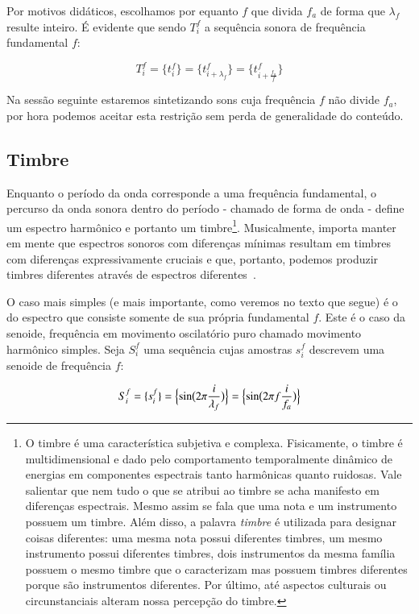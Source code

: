 Por motivos didáticos, escolhamos por equanto $f$ que divida $f_a$ de forma que $\lambda_f$ resulte inteiro.
É evidente que sendo $T_i^f$ a sequência sonora de frequência fundamental $f$:
    
\begin{equation}\label{periodicidade}
     T^f_i=\{ t_i^f \}=\{ t^f_{i+\lambda_{f}}  \}= \{ t^f_{i+\frac{f_a}{f}} \}
\end{equation}

Na sessão seguinte estaremos sintetizando sons cuja frequência $f$ não divide $f_a$, por hora podemos aceitar esta restrição sem perda de generalidade do conteúdo.

\subsection{Timbre}
Enquanto o período da onda corresponde a uma frequência fundamental, o percurso
da onda sonora dentro do período - chamado de forma de onda - define um espectro harmônico e portanto
um timbre\footnote{O timbre é uma característica subjetiva e complexa. Fisicamente,
o timbre é multidimensional e dado pelo comportamento temporalmente dinâmico
de energias em componentes espectrais tanto harmônicas quanto ruidosas.  Vale salientar que nem tudo
o que se atribui ao timbre se acha manifesto em diferenças espectrais. Mesmo
assim se fala que uma nota e um instrumento possuem um timbre.
Além disso, a palavra \emph{timbre} é utilizada para designar coisas diferentes: uma mesma nota
possui diferentes timbres, um mesmo instrumento possui diferentes timbres, dois instrumentos da mesma família possuem o mesmo timbre que o caracterizam mas possuem timbres diferentes porque são instrumentos diferentes.  Por último, até
aspectos culturais ou circunstanciais alteram nossa percepção do timbre.
}. Musicalmente, importa manter em mente que espectros sonoros com diferenças mínimas resultam em timbres com diferenças expressivamente cruciais e que, portanto, podemos produzir timbres diferentes através de espectros diferentes~\cite{Roederer}.


O caso mais simples (e mais importante, como veremos no texto que segue) é o do espectro que consiste somente
de sua própria fundamental $f$. Este é o caso da senoide, frequência em movimento oscilatório puro chamado
movimento harmônico simples. Seja $S_i^f$ uma sequência cujas amostras
$s_i^f$ descrevem uma senoide de frequência $f$:

\begin{equation}\label{senoide}
     S^f_i=\{ s^f_i \}=\Bigl\{ \sin\bigl(2\pi \frac{i}{\lambda_f} \bigr)  \Bigr\} = \Bigl\{ \sin\bigl(2\pi f \frac{i}{f_a}\bigr)  \Bigr\} 
\end{equation}

